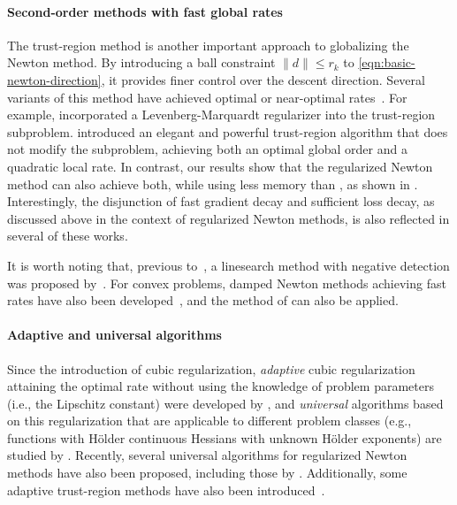 \paragraph{Second-order methods with fast global rates}
The trust-region method is another important approach to globalizing the Newton method.
By introducing a ball constraint $\| d \| \leq r_k$ to \eqref{eqn:basic-newton-direction}, it provides finer control over the descent direction.
Several variants of this method have achieved optimal or near-optimal rates~\citep{curtis2017trust,curtis2021trust,curtis2023worst,jiang2023universal}.
For example, \citet{curtis2021trust,jiang2023universal} incorporated a Levenberg-Marquardt regularizer into the trust-region subproblem.
\citet{hamad2022consistently,hamad2024simple} introduced an elegant and powerful trust-region algorithm that does not modify the subproblem, achieving both an optimal global order and a quadratic local rate.
In contrast, our results show that the regularized Newton method can also achieve both, while using less memory than \citet{hamad2024simple}, as shown in .
Interestingly, the disjunction of fast gradient decay and sufficient loss decay, as discussed above in the context of regularized Newton methods, is also reflected in several of these works.




It is worth noting that, previous to~\citet{royer2020newton}, a linesearch method with negative detection was proposed by~\citet{royer2018complexity}.
For convex problems, damped Newton methods achieving fast rates have also been developed~\citep{hanzely2022damped,hanzely2024damped}, and the method of \citet{jiang2023universal} can also be applied.

\paragraph{Adaptive and universal algorithms}
Since the introduction of cubic regularization, \emph{adaptive} cubic regularization attaining the optimal rate without using the knowledge of problem parameters (i.e., the Lipschitz constant) were developed by \citet{cartis2011adaptive-1,cartis2011adaptive-2}, 
and \emph{universal} algorithms based on this regularization that are applicable to different problem classes (e.g., functions with H\"older continuous Hessians with unknown H\"older exponents) are studied by \citet{grapiglia2017regularized,doikov2021minimizing}.
Recently, several universal algorithms for regularized Newton methods have also been proposed, including those by \citet{he2023newton-hessian,doikov2024super}.
Additionally, some adaptive trust-region methods have also been introduced~\citep{jiang2023universal,hamad2024simple}.


